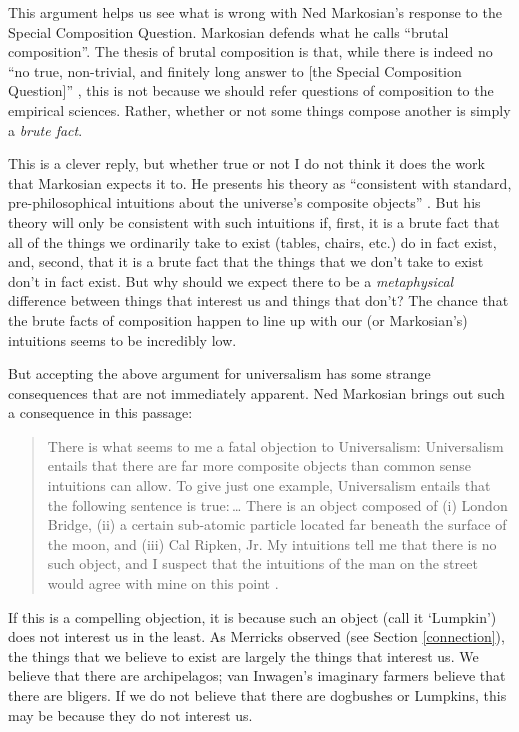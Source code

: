 \documentclass[12pt,twoside]{reedfancy}
\begin{document}
\begin{spacing}{1.25}
This argument helps us see what is wrong with Ned Markosian's response
to the Special Composition Question.  Markosian defends what he calls
``brutal composition''.  The thesis of brutal composition is that,
while there is indeed no ``no true, non-trivial, and finitely long
answer to [the Special Composition Question]''
\citeyearpar[214]{markosian1998a}, this is not because we should refer
questions of composition to the empirical sciences.  Rather, whether
or not some things compose another is simply a {\em brute fact}.

This is a clever reply, but whether true or not I do not think it does
the work that Markosian expects it to.  He presents his theory as
``consistent with standard, pre-philosophical intuitions about the
universe's composite objects'' \citeyearpar[211]{markosian1998a}.  But
his theory will only be consistent with such intuitions if, first, it
is a brute fact that all of the things we ordinarily take to exist
(tables, chairs, etc.) do in fact exist, and, second, that it is a
brute fact that the things that we don't take to exist don't in fact
exist.  But why should we expect there to be a {\em metaphysical}
difference between things that interest us and things that don't?  The
chance that the brute facts of composition happen to line up with our
(or Markosian's) intuitions seems to be incredibly low.

But accepting the above argument for universalism has some strange
consequences that are not immediately apparent.  Ned Markosian brings
out such a consequence in this passage:

\begin{quote}
There is what seems to me a fatal objection to Universalism:
Universalism entails that there are far more composite objects than
common sense intuitions can allow.  To give just one example,
Universalism entails that the following sentence is true:\,\ldots
There is an object composed of (i) London Bridge, (ii) a certain
sub-atomic particle located far beneath the surface of the moon, and
(iii) Cal Ripken, Jr.  My intuitions tell me that there is no such
object, and I suspect that the intuitions of the man on the street
would agree with mine on this point \citeyearpar[228]{markosian1998a}.
\end{quote}

If this is a compelling objection, it is because such an object (call
it `Lumpkin') does not interest us in the least.  As Merricks observed
(see Section \ref{connection}), the things that we believe to exist
are largely the things that interest us.  We believe that there are
archipelagos; van Inwagen's imaginary farmers believe that there are
bligers.  If we do not believe that there are dogbushes or Lumpkins,
this may be because they do not interest us.


\end{spacing}
\end{document}

